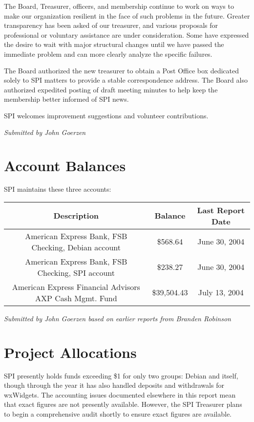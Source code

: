 \documentclass[letterpaper]{report}
\begin{document}
The Board, Treasurer, officers, and membership continue to work on
ways to make our organization resilient in the face of such problems
in the future. Greater transparency has been asked of our treasurer,
and various proposals for professional or voluntary assistance are
under consideration. Some have expressed the desire to wait with major
structural changes until we have passed the immediate problem and
can more clearly analyze the specific failures.

The Board authorized the new treasurer to obtain a Post Office box
dedicated solely to SPI matters to provide a stable correspondence
address. The Board also authorized expedited posting of draft meeting
minutes to help keep the membership better informed of SPI news.

SPI welcomes improvement suggestions and volunteer contributions.

\emph{Submitted by John Goerzen}


\section{Account Balances}

SPI maintains these three accounts:

\begin{tabular}{|c|c|c|}
\hline
Description & Balance & Last Report Date\tabularnewline
\hline
\hline
American Express Bank, FSB Checking, Debian account & \$568.64 & June 30, 2004\tabularnewline
\hline
American Express Bank, FSB Checking, SPI account & \$238.27 & June 30, 2004\tabularnewline
\hline
American Express Financial Advisors AXP Cash Mgmt. Fund & \$39,504.43 & July 13, 2004\tabularnewline
\hline
\end{tabular}

\emph{Submitted by John Goerzen based on earlier reports from Branden Robinson}


\section{Project Allocations}

SPI presently holds funds exceeding \$1 for only two groups: Debian
and itself, though through the year it has also handled deposits and
withdrawals for wxWidgets. The accounting issues documented elsewhere
in this report mean that exact figures are not presently available.
However, the SPI Treasurer plans to begin a comprehensive audit shortly
to ensure exact figures are available.
\end{document}
